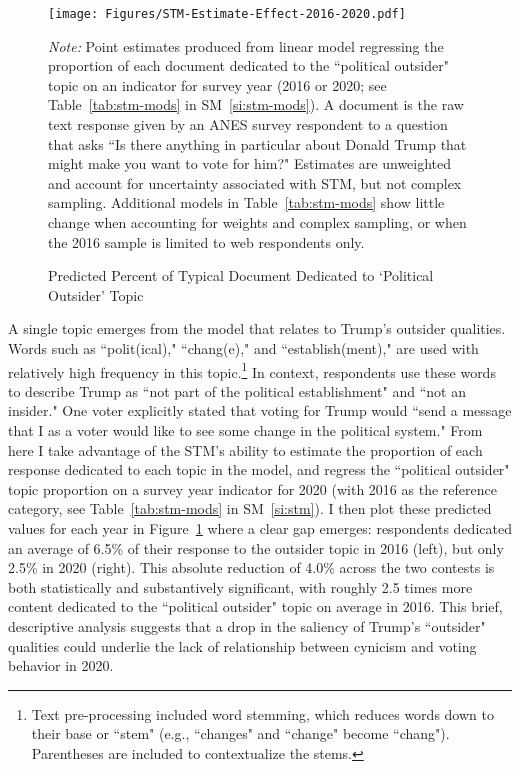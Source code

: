 \documentclass[12pt]{article}
\begin{document}
\begin{figure}[t!]
	\centering
	\texttt{[image: Figures/STM-Estimate-Effect-2016-2020.pdf]}
	\caption{Predicted Percent of Typical Document Dedicated to `Political Outsider' Topic}\label{fig:stm-2016-2020}
	\vspace{-2em}
	{\singlespacing \scriptsize \textit{Note:} Point estimates produced from linear model regressing the proportion of each document dedicated to the ``political outsider" topic on an indicator for survey year (2016 or 2020; see Table~\ref{tab:stm-mods} in SM~\ref{si:stm-mods}). A document is the raw text response given by an ANES survey respondent to a question that asks ``Is there anything in particular about Donald Trump that might make you want to vote for him?" Estimates are unweighted and account for uncertainty associated with STM, but not complex sampling. Additional models in Table~\ref{tab:stm-mods} show little change when accounting for weights and complex sampling, or when the 2016 sample is limited to web respondents only.\par}
\end{figure}

A single topic emerges from the model that relates to Trump's outsider qualities. Words such as ``polit(ical)," ``chang(e)," and ``establish(ment)," are used with relatively high frequency in this topic.\footnote{Text pre-processing included word stemming, which reduces words down to their base or ``stem" (e.g., ``changes" and ``change" become ``chang"). Parentheses are included to contextualize the stems.} In context, respondents use these words to describe Trump as ``not part of the political establishment" and ``not an insider." One voter explicitly stated that voting for Trump would ``send a message that I as a voter would like to see some change in the political system." From here I take advantage of the STM's ability to estimate the proportion of each response dedicated to each topic in the model, and regress the ``political outsider" topic proportion on a survey year indicator for 2020 (with 2016 as the reference category, see Table~\ref{tab:stm-mods} in SM~\ref{si:stm}). I then plot these predicted values for each year in Figure~\ref{fig:stm-2016-2020} where a clear gap emerges: respondents dedicated an average of 6.5\% of their response to the outsider topic in 2016 (left), but only 2.5\% in 2020 (right). This absolute reduction of 4.0\% across the two contests is both statistically and substantively significant, with roughly 2.5 times more content dedicated to the ``political outsider" topic on average in 2016. This brief, descriptive analysis suggests that a drop in the saliency of Trump's ``outsider" qualities could underlie the lack of relationship between cynicism and voting behavior in 2020.
\end{document}
